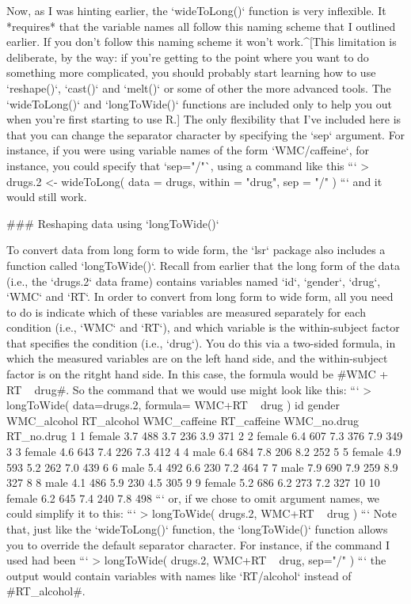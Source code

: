 Now, as I was hinting earlier, the `wideToLong()` function is very inflexible. It *requires* that the variable names all follow this naming scheme that I outlined earlier. If you don't follow this naming scheme it won't work.^[This limitation is deliberate, by the way: if you're getting to the point where you want to do something more complicated, you should probably start learning how to use `reshape()`, `cast()` and `melt()` or some of other the more advanced tools. The `wideToLong()` and `longToWide()` functions are included only to help you out when you're first starting to use R.] The only flexibility that I've included here is that you can change the separator character by specifying the `sep` argument. For instance, if you were using variable names of the form `WMC/caffeine`, for instance, you could specify that `sep="/"`, using a command like this
```
> drugs.2 <- wideToLong( data = drugs, within = "drug", sep = "/" )
```
and it would still work. 


### Reshaping data using `longToWide()`

To convert data from long form to wide form, the `lsr` package also includes a function called `longToWide()`. Recall from earlier that the long form of the data (i.e., the `drugs.2` data frame) contains variables named `id`, `gender`, `drug`, `WMC` and `RT`. In order to convert from long form to wide form, all you need to do is indicate which of these variables are measured separately for each condition (i.e., `WMC` and `RT`), and which variable is the within-subject factor that specifies the condition (i.e., `drug`). You do this via a two-sided formula, in which the measured variables are on the left hand side, and the within-subject factor is on the ritght hand side. In this case, the formula would be \rtextverb#WMC + RT ~ drug#. So the command that we would use might look like this: 
```
> longToWide( data=drugs.2, formula= WMC+RT ~ drug )
   id gender WMC_alcohol RT_alcohol WMC_caffeine RT_caffeine WMC_no.drug RT_no.drug
1   1 female         3.7        488          3.7         236         3.9        371
2   2 female         6.4        607          7.3         376         7.9        349
3   3 female         4.6        643          7.4         226         7.3        412
4   4   male         6.4        684          7.8         206         8.2        252
5   5 female         4.9        593          5.2         262         7.0        439
6   6   male         5.4        492          6.6         230         7.2        464
7   7   male         7.9        690          7.9         259         8.9        327
8   8   male         4.1        486          5.9         230         4.5        305
9   9 female         5.2        686          6.2         273         7.2        327
10 10 female         6.2        645          7.4         240         7.8        498
```
or, if we chose to omit argument names, we could simplify it to this:
```
> longToWide( drugs.2, WMC+RT ~ drug )
```
Note that, just like the `wideToLong()` function, the `longToWide()` function allows you to override the default separator character. For instance, if the command I used had been 
```
> longToWide( drugs.2, WMC+RT ~ drug, sep="/" )
```
the output would contain variables with names like `RT/alcohol` instead of \rtextverb#RT_alcohol#.

